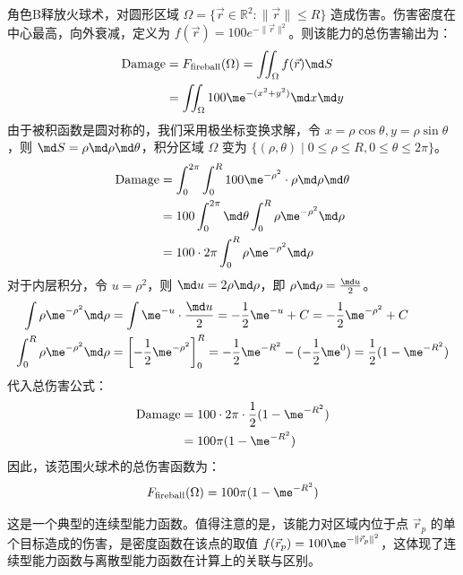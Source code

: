 \begin{example}[范围火球术]
    角色B释放火球术，对圆形区域 $\Omega = \{\vec{r} \in \mathbb{R}^2 : \|\vec{r}\| \leq R\}$ 造成伤害。伤害密度在中心最高，向外衰减，定义为 $f(\vec{r}) = 100 e^{-\|\vec{r}\|^2}$。则该能力的总伤害输出为：
    \begin{align*}
        \text{Damage} & = F_{\text{fireball}}(\Omega) = \iint_{\Omega} f(\vec{r})  \md S \\
                      & = \iint_{\Omega} 100 \me^{-(x^2 + y^2)}  \md x \md y
    \end{align*}
    由于被积函数是圆对称的，我们采用极坐标变换求解，令 $x = \rho \cos\theta,  y = \rho \sin\theta$，则 $\md S = \rho  \md \rho \md \theta$，积分区域 $\Omega$ 变为 $\{(\rho, \theta) \mid 0 \le \rho \le R, 0 \le \theta \le 2\pi\}$。
    \begin{align*}
        \text{Damage} & = \int_{0}^{2\pi} \int_{0}^{R} 100 \me^{-\rho^2} \cdot \rho  \md \rho \md \theta \\
                      & = 100 \int_{0}^{2\pi} \md \theta \int_{0}^{R} \rho \me^{-\rho^2} \md \rho        \\
                      & = 100 \cdot 2\pi \int_{0}^{R} \rho \me^{-\rho^2} \md \rho
    \end{align*}
    对于内层积分，令 $u = \rho^2$，则 $\md u = 2\rho \md \rho$，即 $\rho \md \rho = \frac{\md u}{2}$。
    \begin{align*}
        \int \rho \me^{-\rho^2} \md \rho         & = \int \me^{-u} \cdot \frac{\md u}{2} = -\frac{1}{2}\me^{-u} + C = -\frac{1}{2}\me^{-\rho^2} + C                                  \\
        \int_{0}^{R} \rho \me^{-\rho^2} \md \rho & = \left[ -\frac{1}{2}\me^{-\rho^2} \right]_{0}^{R} = -\frac{1}{2}\me^{-R^2} - (-\frac{1}{2}\me^{0}) = \frac{1}{2}(1 - \me^{-R^2})
    \end{align*}
    代入总伤害公式：
    \begin{align*}
        \text{Damage} & = 100 \cdot 2\pi \cdot \frac{1}{2}(1 - \me^{-R^2}) \\
                      & = 100\pi (1 - \me^{-R^2})
    \end{align*}
    因此，该范围火球术的总伤害函数为：
    \begin{equation}
        F_{\text{fireball}}(\Omega) = 100\pi (1 - \me^{-R^2})
    \end{equation}

    这是一个典型的连续型能力函数。值得注意的是，该能力对区域内位于点 $\vec{r}_p$ 的单个目标造成的伤害，是密度函数在该点的取值 $f(\vec{r}_p) = 100 \me^{-\|\vec{r}_p\|^2}$，这体现了连续型能力函数与离散型能力函数在计算上的关联与区别。
\end{example}

